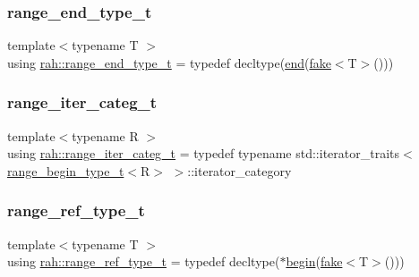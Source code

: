 \subsubsection{\texorpdfstring{range\_end\_type\_t}{range\_end\_type\_t}}
{\footnotesize\ttfamily template$<$typename T $>$ \\
using \mbox{\hyperlink{namespacerah_a9657e24ae477f4482225b133fe286b65}{rah\+::range\+\_\+end\+\_\+type\+\_\+t}} = typedef decltype(\mbox{\hyperlink{namespacerah_aaddd1442cd76b96876e692cdefe7261d}{end}}(\mbox{\hyperlink{namespacerah_a11785bbdf970efa1bc57fc14993b77bf}{fake}}$<$T$>$()))}

\mbox{\label{namespacerah_aff9b9a5748e293f6a1726308c1ac1a01}} 
\subsubsection{\texorpdfstring{range\_iter\_categ\_t}{range\_iter\_categ\_t}}
{\footnotesize\ttfamily template$<$typename R $>$ \\
using \mbox{\hyperlink{namespacerah_aff9b9a5748e293f6a1726308c1ac1a01}{rah\+::range\+\_\+iter\+\_\+categ\+\_\+t}} = typedef typename std\+::iterator\+\_\+traits$<$\mbox{\hyperlink{namespacerah_a28aff4eeddcece6be65ff0b956d32d4a}{range\+\_\+begin\+\_\+type\+\_\+t}}$<$R$>$ $>$\+::iterator\+\_\+category}

\mbox{\label{namespacerah_a6622426bea22e9509614fe4c574ebeca}} 
\subsubsection{\texorpdfstring{range\_ref\_type\_t}{range\_ref\_type\_t}}
{\footnotesize\ttfamily template$<$typename T $>$ \\
using \mbox{\hyperlink{namespacerah_a6622426bea22e9509614fe4c574ebeca}{rah\+::range\+\_\+ref\+\_\+type\+\_\+t}} = typedef decltype($\ast$\mbox{\hyperlink{namespacerah_a2c4a19e57cc4e0753e93830f247def6d}{begin}}(\mbox{\hyperlink{namespacerah_a11785bbdf970efa1bc57fc14993b77bf}{fake}}$<$T$>$()))}

\mbox{\label{namespacerah_a4b32e39fb106af7036b20a39c4f024c1}} 

